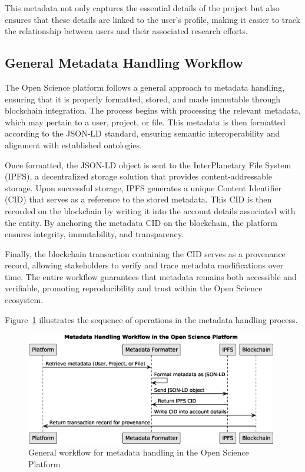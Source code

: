 \documentclass[final]{rc-book-2.14}
\begin{document}
This metadata not only captures the essential details of the project but also ensures that these details are linked to the user's profile, making it easier to track the relationship between users and their associated research efforts.


\subsection{General Metadata Handling Workflow}

The Open Science platform follows a general approach to metadata handling, ensuring that it is properly formatted, stored, and made immutable through blockchain integration. The process begins with processing the relevant metadata, which may pertain to a user, project, or file. This metadata is then formatted according to the JSON-LD standard, ensuring semantic interoperability and alignment with established ontologies.

Once formatted, the JSON-LD object is sent to the InterPlanetary File System (IPFS), a decentralized storage solution that provides content-addressable storage. Upon successful storage, IPFS generates a unique Content Identifier (CID) that serves as a reference to the stored metadata. This CID is then recorded on the blockchain by writing it into the account details associated with the entity. By anchoring the metadata CID on the blockchain, the platform ensures integrity, immutability, and transparency.

Finally, the blockchain transaction containing the CID serves as a provenance record, allowing stakeholders to verify and trace metadata modifications over time. The entire workflow guarantees that metadata remains both accessible and verifiable, promoting reproducibility and trust within the Open Science ecosystem.

Figure~\ref{fig:metadata_workflow} illustrates the sequence of operations in the metadata handling process.


\begin{figure}[htbp]
    \centering
    \includegraphics[width=0.98\textwidth, keepaspectratio]{fig/metadata_workflow_sequence.eps}
    \caption{General workflow for metadata handling in the Open Science Platform}
    \label{fig:metadata_workflow}
\end{figure}
\end{document}
